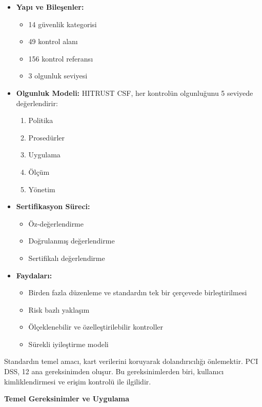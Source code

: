\begin{itemize}
\item \textbf{Yapı ve Bileşenler:}
\begin{itemize}
    \item 14 güvenlik kategorisi
    \item 49 kontrol alanı
    \item 156 kontrol referansı
    \item 3 olgunluk seviyesi
\end{itemize}

\item \textbf{Olgunluk Modeli:} HITRUST CSF, her kontrolün olgunluğunu 5 seviyede değerlendirir:
\begin{enumerate}
    \item Politika
    \item Prosedürler
    \item Uygulama
    \item Ölçüm
    \item Yönetim
\end{enumerate}

\item \textbf{Sertifikasyon Süreci:}
\begin{itemize}
    \item Öz-değerlendirme
    \item Doğrulanmış değerlendirme
    \item Sertifikalı değerlendirme
\end{itemize}

\item \textbf{Faydaları:}
\begin{itemize}
    \item Birden fazla düzenleme ve standardın tek bir çerçevede birleştirilmesi
    \item Risk bazlı yaklaşım
    \item Ölçeklenebilir ve özelleştirilebilir kontroller
    \item Sürekli iyileştirme modeli
\end{itemize}
\end{itemize} Standardın temel amacı, kart verilerini koruyarak dolandırıcılığı önlemektir. PCI DSS, 12 ana gereksinimden oluşur. Bu gereksinimlerden biri, kullanıcı kimliklendirmesi ve erişim kontrolü ile ilgilidir.

\textbf{Temel Gereksinimler ve Uygulama}

